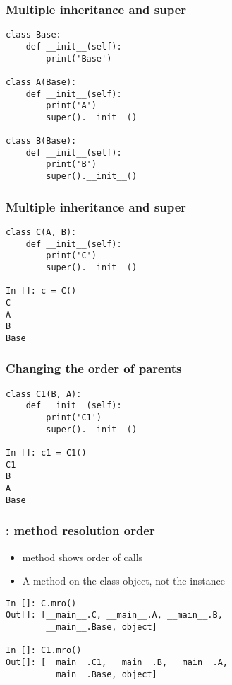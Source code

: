 \documentclass[14pt,compress,aspectratio=169]{beamer}
\begin{document}
\begin{frame}
  \frametitle{Multiple inheritance and super}
  \small
  \vspace*{-0.1in}
  \begin{lstlisting}
class Base:
    def __init__(self):
        print('Base')

class A(Base):
    def __init__(self):
        print('A')
        super().__init__()

class B(Base):
    def __init__(self):
        print('B')
        super().__init__()

  \end{lstlisting}

\end{frame}

\begin{frame}[fragile]
  \frametitle{Multiple inheritance and super}
  \small
  \begin{lstlisting}
class C(A, B):
    def __init__(self):
        print('C')
        super().__init__()

In []: c = C()
C
A
B
Base
\end{lstlisting}

\end{frame}


\begin{frame}[fragile]
  \frametitle{Changing the order of parents}
  \small
  \begin{lstlisting}
class C1(B, A):
    def __init__(self):
        print('C1')
        super().__init__()

In []: c1 = C1()
C1
B
A
Base
\end{lstlisting}
\end{frame}

\begin{frame}[fragile]
  \frametitle{:  method resolution order}
  \begin{itemize}
  \item {} method shows order of calls
  \item A method on the class object, not the instance
  \end{itemize}
  \begin{lstlisting}
In []: C.mro()
Out[]: [__main__.C, __main__.A, __main__.B,
        __main__.Base, object]

In []: C1.mro()
Out[]: [__main__.C1, __main__.B, __main__.A,
        __main__.Base, object]
  \end{lstlisting}
\end{frame}
\end{document}
